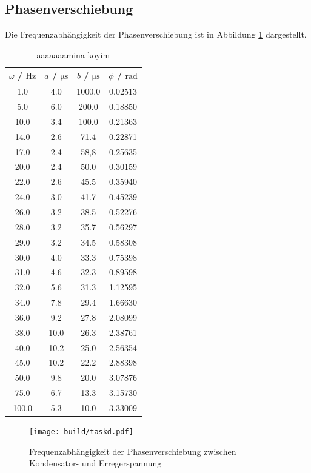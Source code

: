 \subsection{Phasenverschiebung}

Die Frequenzabhängigkeit der Phasenverschiebung ist in Abbildung \ref{fig:phasenplot} dargestellt.

\begin{table}
	\caption{aaaaaaamina koyim}
	\centering
	\label{tab:muh}
	\begin{tabular}{cccc}
		\toprule
		$\omega$ / $\si{\Hz}$ & $a$ / $\si{\micro\second}$ & $b$ / $\si{\micro\second}$ & $\phi$ / $\si{\radian}$ \\
		\midrule
		1.0 & 4.0 & 1000.0 & 0.02513 \\
		5.0 & 6.0 & 200.0 & 0.18850 \\
		10.0 & 3.4 & 100.0 & 0.21363 \\
		14.0 & 2.6 & 71.4 & 0.22871 \\
		17.0 & 2.4 & 58,8 & 0.25635 \\
		20.0 & 2.4 & 50.0 & 0.30159 \\
		22.0 & 2.6 & 45.5 & 0.35940 \\
		24.0 & 3.0 & 41.7 & 0.45239 \\
		26.0 & 3.2 & 38.5 & 0.52276 \\
		28.0 & 3.2 & 35.7 & 0.56297 \\
		29.0 & 3.2 & 34.5 & 0.58308 \\
		30.0 & 4.0 & 33.3 & 0.75398 \\
		31.0 & 4.6 & 32.3 & 0.89598 \\
		32.0 & 5.6 & 31.3 & 1.12595 \\
		34.0 & 7.8 & 29.4 & 1.66630 \\
		36.0 & 9.2 & 27.8 & 2.08099 \\
		38.0 & 10.0 & 26.3 & 2.38761 \\
		40.0 & 10.2 & 25.0 & 2.56354 \\
		45.0 & 10.2 & 22.2 & 2.88398 \\
		50.0 & 9.8 & 20.0 & 3.07876 \\
		75.0 & 6.7 & 13.3 & 3.15730 \\
		100.0 & 5.3 & 10.0 & 3.33009 \\
	\bottomrule
	\end{tabular}
\end{table}



\begin{figure}
	\centering
	\texttt{[image: build/taskd.pdf]}
	\caption{Frequenzabhängigkeit der Phasenverschiebung zwischen Kondensator- und Erregerspannung}
	\label{fig:phasenplot}
\end{figure}

